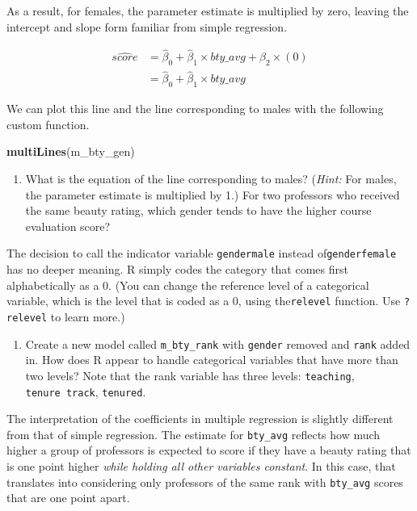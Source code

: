 \documentclass[
]{article}
\newenvironment{Shaded}{\begin{snugshade}}{\end{snugshade}}
\newcommand{\KeywordTok}[1]{\textcolor[rgb]{0.13,0.29,0.53}{\textbf{#1}}}
\newcommand{\NormalTok}[1]{#1}
\providecommand{\tightlist}{%
  \setlength{\itemsep}{0pt}\setlength{\parskip}{0pt}}
\begin{document}
As a result, for females, the parameter estimate is multiplied by zero,
leaving the intercept and slope form familiar from simple regression.

\[
  \begin{aligned}
\widehat{score} &= \hat{\beta}_0 + \hat{\beta}_1 \times bty\_avg + \hat{\beta}_2 \times (0) \\
&= \hat{\beta}_0 + \hat{\beta}_1 \times bty\_avg\end{aligned}
\]

We can plot this line and the line corresponding to males with the
following custom function.

\begin{Shaded}
\begin{Highlighting}[]
\KeywordTok{multiLines}\NormalTok{(m_bty_gen)}
\end{Highlighting}
\end{Shaded}

\begin{enumerate}
\def\labelenumi{\arabic{enumi}.}
\setcounter{enumi}{8}
\tightlist
\item
  What is the equation of the line corresponding to males? (\emph{Hint:}
  For males, the parameter estimate is multiplied by 1.) For two
  professors who received the same beauty rating, which gender tends to
  have the higher course evaluation score?
\end{enumerate}

The decision to call the indicator variable \texttt{gendermale} instead
of\texttt{genderfemale} has no deeper meaning. R simply codes the
category that comes first alphabetically as a \(0\). (You can change the
reference level of a categorical variable, which is the level that is
coded as a 0, using the\texttt{relevel} function. Use \texttt{?relevel}
to learn more.)

\begin{enumerate}
\def\labelenumi{\arabic{enumi}.}
\setcounter{enumi}{9}
\tightlist
\item
  Create a new model called \texttt{m\_bty\_rank} with \texttt{gender}
  removed and \texttt{rank} added in. How does R appear to handle
  categorical variables that have more than two levels? Note that the
  rank variable has three levels: \texttt{teaching},
  \texttt{tenure\ track}, \texttt{tenured}.
\end{enumerate}

The interpretation of the coefficients in multiple regression is
slightly different from that of simple regression. The estimate for
\texttt{bty\_avg} reflects how much higher a group of professors is
expected to score if they have a beauty rating that is one point higher
\emph{while holding all other variables constant}. In this case, that
translates into considering only professors of the same rank with
\texttt{bty\_avg} scores that are one point apart.
\end{document}
